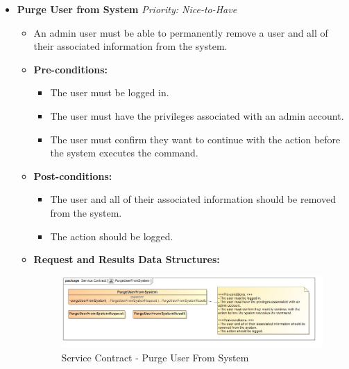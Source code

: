 \documentclass{article}
\begin{document}
\begin{itemize}
					\cleardoublepage
					\item \textbf{Purge User from System} \hfill \textit{Priority: Nice-to-Have}
					\begin{itemize}
						\item An admin user must be able to permanently remove a user and all of their associated information from the system.
						\item \textbf{Pre-conditions:}
						\begin{itemize}
							\item The user must be logged in.
							\item The user must have the privileges associated with an admin account.
							\item The user must confirm they want to continue with the action before the system executes the command.
						\end{itemize}
						\item \textbf{Post-conditions:}
						\begin{itemize}
							\item The user and all of their associated information should be removed from the system.
							\item The action should be logged.
						\end{itemize}
						\item \textbf{Request and Results Data Structures:}
						\begin{figure}[H]
							\includegraphics[width=\linewidth]{../Diagrams/ServiceContracts/PurgeUserFromSystem.jpg}
							\caption{Service Contract - Purge User From System}
						\end{figure}
					\end{itemize}
					

\end{itemize}
\end{document}
